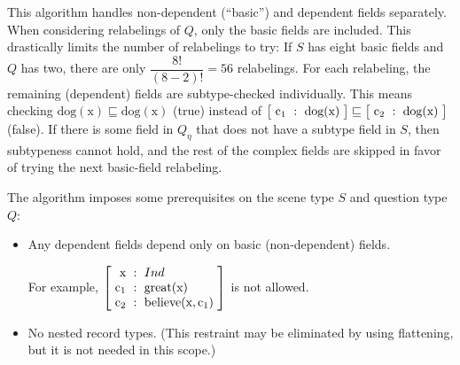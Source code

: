 This algorithm handles non-dependent (``basic'') and dependent fields separately.
When considering relabelings of $Q$, only the basic fields are included.
This drastically limits the number of relabelings to try:
If $S$ has eight basic fields and $Q$ has two, there are only $\dfrac{8!}{(8-2)!} = 56$ relabelings.
For each relabeling, the remaining (dependent) fields are subtype-checked individually.
This means checking
$\text{dog}(\text{x}) \sqsubseteq \text{dog}(\text{x})$ (true) instead of
$\rec{\text{c}_1 &:& \text{dog}(\text{x})} \sqsubseteq \rec{\text{c}_2 &:& \text{dog}(\text{x})}$ (false).
If there is some field in $Q_\eta$ that does not have a subtype field in $S$, then subtypeness cannot hold, and the rest of the complex fields are skipped in favor of trying the next basic-field relabeling.


The algorithm imposes some prerequisites on the scene type $S$ and question type $Q$:

\begin{itemize}
\item Any dependent fields depend only on basic (non-dependent) fields.

For example, $\rec{
\text{x} &:& Ind \\
\text{c}_1 &:& \text{great}(\text{x}) \\
\text{c}_2 &:& \text{believe}(\text{x}, \text{c}_1)
}$ is not allowed.

\item No nested record types.
(This restraint may be eliminated by using flattening, but it is not needed in this scope.)
\end{itemize}

